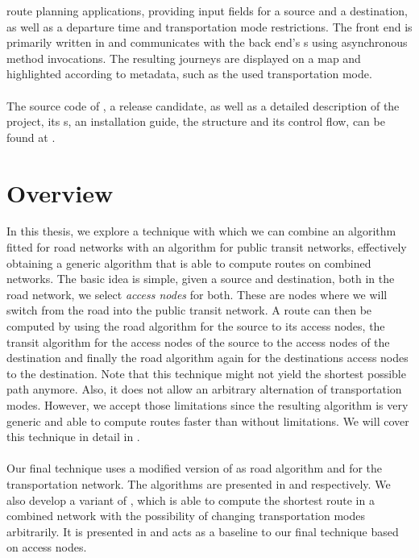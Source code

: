 	route planning applications, providing input fields for a source and a destination, as well as a departure time and transportation mode
	restrictions. The front end is primarily written in \js and communicates with the back end's {\restApi}s using asynchronous method invocations.
	The resulting journeys are displayed on a map and highlighted according to metadata, such as the used transportation mode.\\\\
	The source code of \cobweb, a release candidate, as well as a detailed description of the project, its {\api}s, an installation guide,
	the structure and its control flow, can be found at .
	
\section{Overview}
	In this thesis, we explore a technique with which we can combine an algorithm fitted for road networks with an algorithm
	for public transit networks, effectively obtaining a generic algorithm that is able to compute routes on combined networks.
	The basic idea is simple, given a source and destination, both in the road network, we select \textit{access nodes} for both.
	These are nodes where we will switch from the road into the public transit network. A route can then be computed by
	using the road algorithm for the source to its access nodes, the transit algorithm for the access nodes of the source
	to the access nodes of the destination and finally the road algorithm again for the destinations access nodes to
	the destination. Note that this technique might not yield the shortest possible path anymore. Also, it does not allow
	an arbitrary alternation of transportation modes. However, we accept those limitations since the resulting
	algorithm is very generic and able to compute routes faster than without limitations. We will cover this technique in detail
	in .\\\\
	Our final technique uses a modified version of \alt {} as road algorithm and \csa {} for the transportation network.
	The algorithms are presented in  and  respectively.
	We also develop a \multiModal variant of \dijkstra {}, which is able to compute the shortest route in a combined
	network with the possibility of changing transportation modes arbitrarily. It is presented in 
	and acts as a baseline to our final technique based on access nodes.
	

